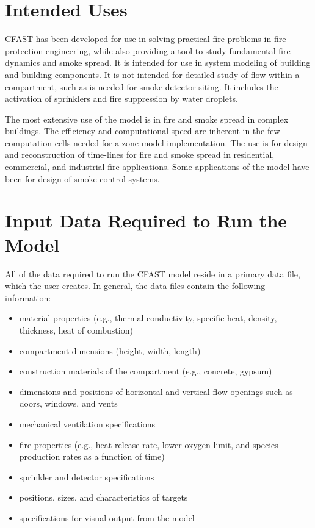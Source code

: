 \documentclass[12pt]{book}
\begin{document}
\section{Intended Uses}

CFAST has been developed for use in solving practical fire problems in fire protection engineering, while also providing a tool to study fundamental fire dynamics and smoke spread. It is intended for use in system modeling of building and building components. It is not intended for detailed study of flow within a compartment, such as is needed for smoke detector siting. It includes the activation of sprinklers and fire suppression by water droplets.

The most extensive use of the model is in fire and smoke spread in complex buildings. The efficiency and computational speed are inherent in the few computation cells needed for a zone model implementation. The use is for design and reconstruction of time-lines for fire and smoke spread in residential, commercial, and industrial fire applications. Some applications of the model have been for design of smoke control systems.

\section{Input Data Required to Run the Model}

All of the data required to run the CFAST model reside in a primary data file, which the user creates. In general, the data files contain the following information:

\begin{itemize}
\item material properties (e.g., thermal conductivity, specific heat, density, thickness, heat of combustion)
\item compartment dimensions (height, width, length)
\item construction materials of the compartment (e.g., concrete, gypsum)
\item dimensions and positions of horizontal and vertical flow openings such as doors, windows, and vents
\item mechanical ventilation specifications
\item fire properties (e.g., heat release rate, lower oxygen limit, and species production rates as a function of time)
\item sprinkler and detector specifications
\item positions, sizes, and characteristics of targets
\item specifications for visual output from the model
\end{itemize}
\end{document}
